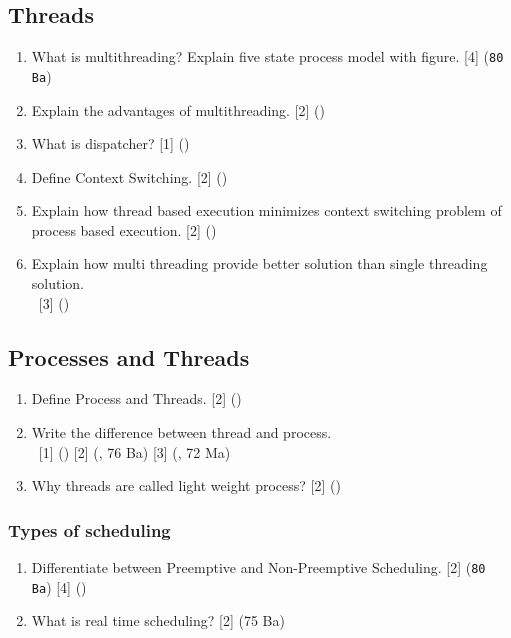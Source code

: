 \documentclass[12pt]{article}
\newcommand{\enter}{\\\textcolor{white}{1}}
\begin{document}
	\subsection{Threads}
		\begin{enumerate}[noitemsep, topsep = 0pt]
			\item What is multithreading? Explain five state process model with figure. \hfill [4] (\texttt{80 Ba})
			
			\item Explain the advantages of multithreading. \hfill [2] ()
			
			\item What is dispatcher? \hfill [1] ()
			
			\item Define Context Switching. \hfill [2] ()
			
			\item Explain how thread based execution minimizes context switching problem of process based execution. \hfill [2] ()
			
			\item Explain how multi threading provide better solution than single threading solution.
			\enter \hfill [3] ()
		\end{enumerate}

	\subsection{Processes and Threads}
		\begin{enumerate}[noitemsep, topsep = 0pt]
			\item Define Process and Threads. \hfill [2] ()
			
			\item Write the difference between thread and process. 
			\enter\hfill [1] () [2] (, 76 Ba) [3] (, 72 Ma)
			
			\item Why threads are called light weight process? \hfill [2] ()
		\end{enumerate}

		\subsubsection{Types of scheduling}
			\begin{enumerate}[noitemsep, topsep = 0pt]
				\item Differentiate between Preemptive and Non-Preemptive Scheduling. \hfill [2] (\texttt{80 Ba}) [4] ()
				
				\item What is real time scheduling? \hfill [2] (75 Ba)
			\end{enumerate}
\end{document}
